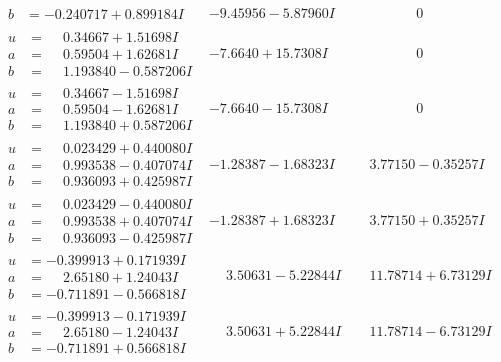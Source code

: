 \documentclass[1p]{elsarticle_modified}
\theoremstyle{definition}
\begin{document}
$$\begin{array}{c|c|c}
\begin{aligned}
b &= -0.240717 + 0.899184 I\end{aligned}
 & -9.45956 - 5.87960 I & \phantom{-0.000000 } 0 \\ \hline\begin{aligned}
u &= \phantom{-}0.34667 + 1.51698 I \\
a &= \phantom{-}0.59504 + 1.62681 I \\
b &= \phantom{-}1.193840 - 0.587206 I\end{aligned}
 & -7.6640 + 15.7308 I & \phantom{-0.000000 } 0 \\ \hline\begin{aligned}
u &= \phantom{-}0.34667 - 1.51698 I \\
a &= \phantom{-}0.59504 - 1.62681 I \\
b &= \phantom{-}1.193840 + 0.587206 I\end{aligned}
 & -7.6640 - 15.7308 I & \phantom{-0.000000 } 0 \\ \hline\begin{aligned}
u &= \phantom{-}0.023429 + 0.440080 I \\
a &= \phantom{-}0.993538 - 0.407074 I \\
b &= \phantom{-}0.936093 + 0.425987 I\end{aligned}
 & -1.28387 - 1.68323 I & \phantom{-}3.77150 - 0.35257 I \\ \hline\begin{aligned}
u &= \phantom{-}0.023429 - 0.440080 I \\
a &= \phantom{-}0.993538 + 0.407074 I \\
b &= \phantom{-}0.936093 - 0.425987 I\end{aligned}
 & -1.28387 + 1.68323 I & \phantom{-}3.77150 + 0.35257 I \\ \hline\begin{aligned}
u &= -0.399913 + 0.171939 I \\
a &= \phantom{-}2.65180 + 1.24043 I \\
b &= -0.711891 - 0.566818 I\end{aligned}
 & \phantom{-}3.50631 - 5.22844 I & \phantom{-}11.78714 + 6.73129 I \\ \hline\begin{aligned}
u &= -0.399913 - 0.171939 I \\
a &= \phantom{-}2.65180 - 1.24043 I \\
b &= -0.711891 + 0.566818 I\end{aligned}
 & \phantom{-}3.50631 + 5.22844 I & \phantom{-}11.78714 - 6.73129 I \\ \hline\begin{aligned}

\end{aligned}
\end{array}$$
\end{document}
